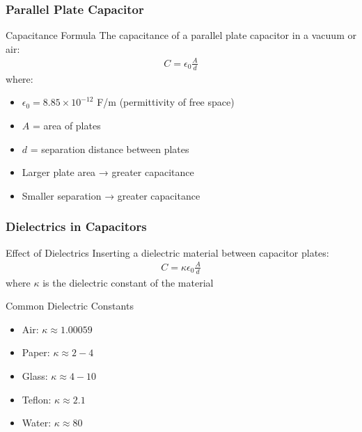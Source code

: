 \documentclass{beamer}
\begin{document}
\begin{frame}
    \frametitle{Parallel Plate Capacitor}
    
    \begin{block}{Capacitance Formula}
        The capacitance of a parallel plate capacitor in a vacuum or air:
        \begin{align}
            C = \epsilon_0 \frac{A}{d}
        \end{align}
        where:
        \begin{itemize}
            \item $\epsilon_0 = 8.85 \times 10^{-12}$ F/m (permittivity of free space)
            \item $A$ = area of plates
            \item $d$ = separation distance between plates
        \end{itemize}
    \end{block}
    
    \begin{itemize}
        \item Larger plate area → greater capacitance
        \item Smaller separation → greater capacitance
    \end{itemize}
\end{frame}

\begin{frame}
    \frametitle{Dielectrics in Capacitors}
    
    \begin{block}{Effect of Dielectrics}
        Inserting a dielectric material between capacitor plates:
        \begin{align}
            C = \kappa\epsilon_0 \frac{A}{d}
        \end{align}
        where $\kappa$ is the dielectric constant of the material
    \end{block}
    
    \begin{block}{Common Dielectric Constants}
        \begin{itemize}
            \item Air: $\kappa \approx 1.00059$
            \item Paper: $\kappa \approx 2-4$
            \item Glass: $\kappa \approx 4-10$
            \item Teflon: $\kappa \approx 2.1$
            \item Water: $\kappa \approx 80$
        \end{itemize}
    \end{block}
    
 
\end{frame}
\end{document}
